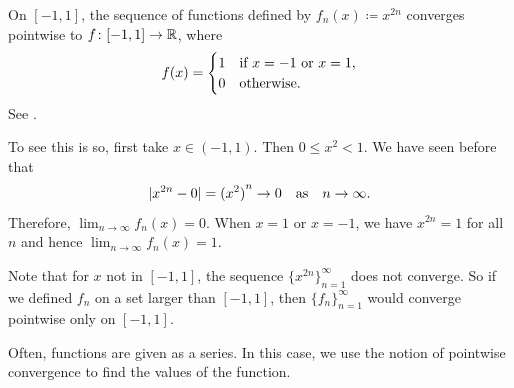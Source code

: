 \begin{example}
On $[-1,1]$, the sequence of functions defined by $f_n(x) \coloneqq x^{2n}$
converges pointwise to $f \colon [-1,1] \to {\mathbb{R}}$, where
\begin{equation*}
f(x) =
\begin{cases}
1 & \text{if } x=-1 \text{ or } x=1, \\
0 & \text{otherwise.}
\end{cases}
\avoidbreak
\end{equation*}
See .

\begin{myfigureht}
\caption{Graphs of $f_1$, $f_2$, $f_3$, and $f_8$ for $f_n(x) \coloneqq
x^{2n}$.\label{x2nfig}}
\end{myfigureht}

To see this is so, first take $x \in (-1,1)$.  Then 
$0 \leq x^2 < 1$.
We have seen before that
\begin{equation*}
\lvert {x^{2n} - 0} \rvert = {(x^2)}^n \to 0 \quad \text{as} \quad n \to \infty .
\end{equation*}
Therefore, $\lim_{n\to\infty}f_n(x) = 0$.
When $x = 1$ or $x=-1$, we have $x^{2n} = 1$ for all $n$ and hence
$\lim_{n\to\infty}f_n(x) = 1$.

Note that for $x$ not in $[-1,1]$, the sequence
$\{ x^{2n} \}_{n=1}^\infty$ does not converge.
So if we defined $f_n$ on a set larger than $[-1,1]$,
then $\{ f_n \}_{n=1}^\infty$
would converge pointwise only on $[-1,1]$.
\end{example}

Often, functions are given as a series.  In this case, we use
the notion of pointwise convergence to find the values of the function.

